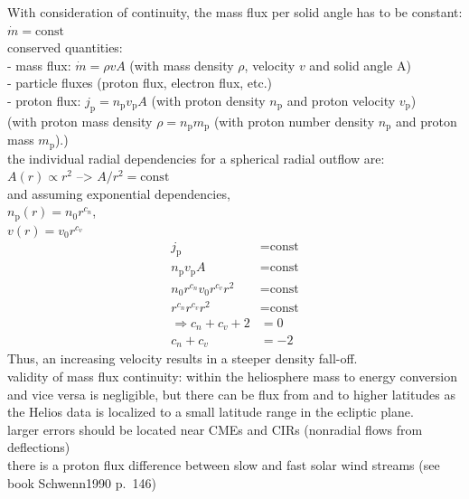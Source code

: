 
With consideration of continuity, the mass flux per solid angle has to be constant: $\dot{m} = \text{const}$\\
conserved quantities:\\
- mass flux: $\dot{m} = \rho v A$ (with mass density $\rho$, velocity $v$ and solid angle A)\\
- particle fluxes (proton flux, electron flux, etc.)\\
	- proton flux: $j_\text{p} = n_\text{p} v_\text{p} A$ (with proton density $n_\text{p}$ and proton velocity $v_\text{p}$)\\

(with proton mass density $\rho = n_\text{p} m_\text{p}$ (with proton number density $n_\text{p}$ and proton mass $m_\text{p}$).)\\

the individual radial dependencies for a spherical radial outflow are:\\
$A(r) \propto r^2$ --> $A/r^2 = \text{const}$\\
and assuming exponential dependencies,\\
$n_{\text{p}}(r) = n_0 r^{c_n}$,\\
$v(r) = v_0 r^{c_v}$\\
\begin{align}
	j_\text{p} &= \text{const}\\
	n_\text{p} v_\text{p} A &= \text{const}\\
	n_0 r^{c_n} v_0 r^{c_v} r^2 &= \text{const}\\
	r^{c_n} r^{c_v} r^2 &= \text{const}\\
	\Rightarrow c_n + c_v + 2 &= 0\\
	c_n + c_v &= -2
\end{align}
Thus, an increasing velocity results in a steeper density fall-off.\\

validity of mass flux continuity: within the heliosphere mass to energy conversion and vice versa is negligible, but there can be flux from and to higher latitudes as the Helios data is localized to a small latitude range in the ecliptic plane.\\
larger errors should be located near CMEs and CIRs (nonradial flows from deflections)\\
there is a proton flux difference between slow and fast solar wind streams (see book Schwenn1990 p.~146)

